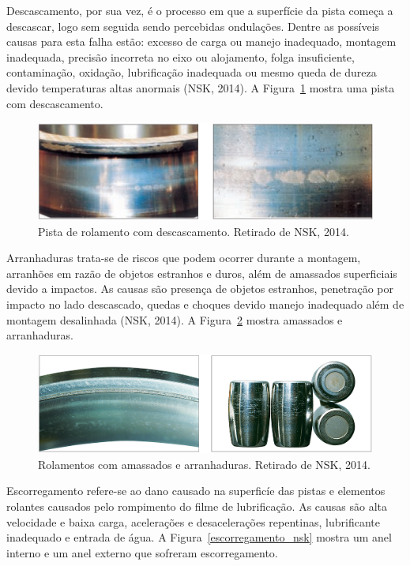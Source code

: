 \documentclass[
	12pt,				
	oneside,			
	a4paper,			
	english,			
	brazil,			
	]{abntex2ppgsi}
\begin{document}
Descascamento, por sua vez, é o processo em que a superfície da pista começa a descascar, logo sem seguida sendo percebidas ondulações. Dentre as possíveis causas para esta falha estão: excesso de carga ou manejo inadequado, montagem inadequada, precisão incorreta no eixo ou alojamento, folga insuficiente, contaminação, oxidação, lubrificação inadequada ou mesmo queda de dureza devido temperaturas altas anormais (NSK, 2014). A Figura~\ref{descascamento_nsk} mostra uma pista com descascamento.

\begin{figure}[H]
\centering
\includegraphics[width=\textwidth,height=\textheight,keepaspectratio]{descascamento_nsk}
\caption {Pista de rolamento com descascamento. Retirado de NSK, 2014.}
\label{descascamento_nsk}
\end{figure}

Arranhaduras trata-se de riscos que podem ocorrer durante a montagem, arranhões em razão de objetos estranhos e duros, além de amassados superficiais devido a impactos. As causas são presença de objetos estranhos, penetração por impacto no lado descascado, quedas e choques devido manejo inadequado além de montagem desalinhada (NSK, 2014). A Figura~\ref{arranhaduras_nsk} mostra amassados e arranhaduras. 

\begin{figure}[H]
\centering
\includegraphics[width=\textwidth,height=\textheight,keepaspectratio]{arranhaduras_nsk}
\caption {Rolamentos com amassados e arranhaduras. Retirado de NSK, 2014.}
\label{arranhaduras_nsk}
\end{figure}

Escorregamento refere-se ao dano causado na superficíe das pistas e elementos rolantes causados pelo rompimento do filme de lubrificação. As causas são alta velocidade e baixa carga, acelerações e desacelerações repentinas, lubrificante inadequado e entrada de água. A Figura~\ref{escorregamento_nsk} mostra um anel interno e um anel externo que sofreram escorregamento. 
\end{document}
